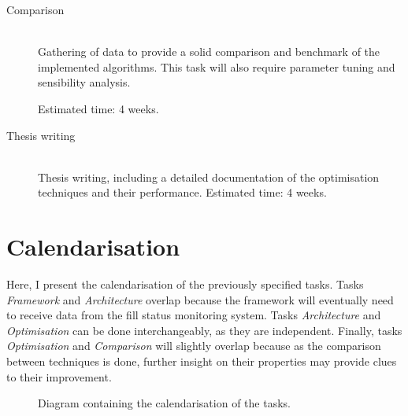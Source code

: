 \begin{description}
\item[Comparison] \hfill \\
Gathering of data to provide a solid comparison and benchmark of the
implemented algorithms. This task will also require parameter tuning and
sensibility analysis.


Estimated time: 4 weeks.

\item[Thesis writing] \hfill \\
Thesis writing, including a detailed documentation of the optimisation
techniques and their performance. Estimated time: 4 weeks.

\end{description}


\newpage
\section{Calendarisation}
\label{section:calendarisation}

Here, I present the calendarisation of the previously specified tasks.  Tasks
\textit{Framework} and \textit{Architecture} overlap because the framework will
eventually need to receive data from the fill status monitoring system.  Tasks
\textit{Architecture} and \textit{Optimisation} can be done interchangeably, as
they are independent. Finally, tasks \textit{Optimisation} and
\textit{Comparison} will slightly overlap because as the comparison between
techniques is done, further insight on their properties may provide clues to
their improvement.

\vspace{2cm}

\begin{figure}[th]
  \begin{center}
    \leavevmode


    \caption{Diagram containing the calendarisation of the tasks.}
    \label{fig:gantt}
  \end{center}
\end{figure}

